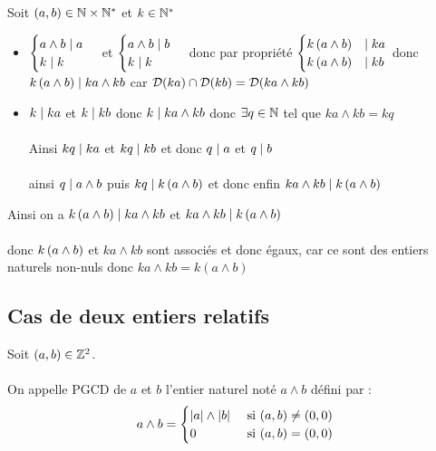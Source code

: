 \begin{dem}
    Soit \((a, b) \in \mathbb{N} \times \mathbb{N}^*\) et \(k \in \mathbb{N}^*\)
    \begin{itemize}
        \item \(\begin{cases}
            a\wedge b \mid a \\
            k \mid k
        \end{cases}\) 
        et 
        \(\begin{cases}
            a\wedge b \mid b \\
            k \mid k
        \end{cases}\)
         donc par propriété 
         \(\begin{cases}
            k\left(a\wedge b\right) &\mid ka \\
            k\left(a\wedge b\right) &\mid kb
         \end{cases}\) donc \(k\left(a\wedge b\right) \mid ka\wedge kb\) car \(\mathcal{D}(ka)\cap \mathcal{D}(kb) = \mathcal{D}(ka\wedge kb)\)
         \item \(k \mid ka\) et \(k \mid kb\) donc \(k \mid ka \wedge kb\) donc \(\exists q \in \mathbb{N}\) tel que \(ka \wedge kb = kq\)\\~\\
         Ainsi \(kq\mid ka\) et \(kq\mid kb\) et donc \(q\mid a\) et \(q \mid b\)\\~\\
         ainsi \(q \mid a\wedge b\) puis \(kq \mid k\left(a\wedge b\right)\) et donc enfin \(ka \wedge kb \mid k\left( a \wedge b\right)\)
    \end{itemize}
    Ainsi on a \(k\left(a\wedge b\right) \mid ka\wedge kb\) et \(ka \wedge kb \mid k\left( a \wedge b\right)\) \\~\\
    donc \(k\left(a\wedge b\right) \) et \(ka\wedge kb\) sont associés et donc égaux, car ce sont des entiers naturels non-nuls donc \(ka \wedge kb = k (a \wedge b)\)
\end{dem}

\subsection{Cas de deux entiers relatifs}

\begin{defi}
    Soit \((a, b) \in \mathbb{Z}^2\). \\~\\
    On appelle PGCD de \(a\) et \(b\) l’entier naturel noté \(a \wedge b\) défini par :
    \[a \wedge b = \begin{cases}
        \left\lvert a\right\rvert \wedge \left\lvert b\right\rvert &\text{ si } (a, b) \neq (0, 0) \\
        0 &\text{ si } (a, b) = (0, 0)
    \end{cases}
    \]
\end{defi}

